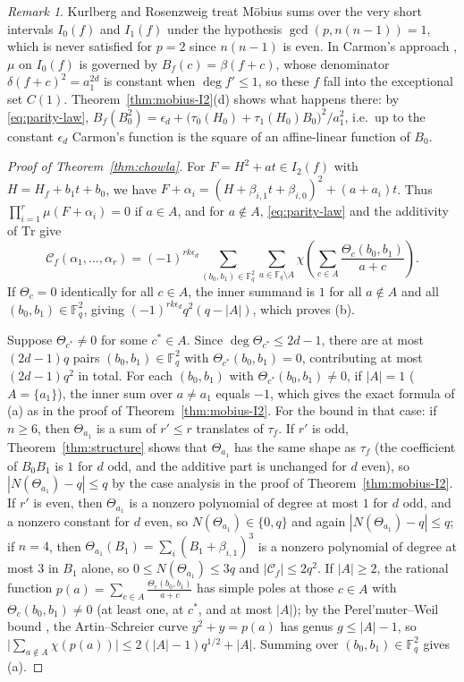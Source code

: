 \documentclass[11pt,a4paper]{amsart}
\theoremstyle{remark}
\newtheorem{remark}[theorem]{Remark}
\numberwithin{equation}{section}
\newcommand{\Fq}{\mathbb{F}_q}
\newcommand{\Tr}{\mathrm{Tr}}
\begin{document}
\begin{remark}\label{rem:KR}
Kurlberg and Rosenzweig \cite[Theorem~13]{KR} treat M\"obius sums over the very short intervals $I_0(f)$ and $I_1(f)$
under the hypothesis $\gcd(p,n(n-1))=1$, which is never satisfied for $p=2$ since $n(n-1)$ is even. In Carmon's
approach \cite{Carmon}, $\mu$ on $I_0(f)$ is governed by $B_f(c)=\beta(f+c)$, whose denominator $\delta(f+c)^2=a_1^{2d}$
is constant when $\deg f'\le 1$, so these $f$ fall into the exceptional set $C(1)$.
Theorem~\ref{thm:mobius-I2}(d) shows what happens there: by \eqref{eq:parity-law},
$B_f(B_0^2)=\epsilon_d+\bigl(\tau_0(H_0)+\tau_1(H_0)B_0\bigr)^2/a_1^2$, i.e.\ up to the constant $\epsilon_d$ Carmon's
function is the square of an affine-linear function of $B_0$.
\end{remark}

\begin{proof}[Proof of Theorem~\ref{thm:chowla}]
For $F=H^2+at\in I_2(f)$ with $H=H_f+b_1t+b_0$, we have $F+\alpha_i=(H+\beta_{i,1}t+\beta_{i,0})^2+(a+a_i)t$. Thus
$\prod_{i=1}^r\mu(F+\alpha_i)=0$ if $a\in A$, and for $a\notin A$, \eqref{eq:parity-law} and the additivity of $\Tr$
give
\[
\mathcal{C}_f(\alpha_1,\dots,\alpha_r)=(-1)^{rk\epsilon_d}\sum_{(b_0,b_1)\in\Fq^2}\sum_{a\in\Fq\setminus A}
\chi\!\left(\sum_{c\in A}\frac{\Theta_c(b_0,b_1)}{a+c}\right).
\]
If $\Theta_c=0$ identically for all $c\in A$, the inner summand is $1$ for all $a\notin A$ and all $(b_0,b_1)\in\Fq^2$,
giving $(-1)^{rk\epsilon_d}q^2(q-|A|)$, which proves (b).

Suppose $\Theta_{c^*}\ne 0$ for some $c^*\in A$. Since $\deg\Theta_{c^*}\le 2d-1$, there are at most $(2d-1)q$ pairs
$(b_0,b_1)\in\Fq^2$ with $\Theta_{c^*}(b_0,b_1)=0$, contributing at most $(2d-1)q^2$ in total. For each $(b_0,b_1)$
with $\Theta_{c^*}(b_0,b_1)\ne 0$, if $|A|=1$ ($A=\{a_1\}$), the inner sum over $a\ne a_1$ equals $-1$, which gives the
exact formula of (a) as in the proof of Theorem~\ref{thm:mobius-I2}. For the bound in that case: if $n\ge 6$, then
$\Theta_{a_1}$ is a sum of $r'\le r$ translates of $\tau_f$. If $r'$ is odd, Theorem~\ref{thm:structure} shows that
$\Theta_{a_1}$ has the same shape as $\tau_f$ (the coefficient of $B_0B_1$ is $1$ for $d$ odd, and the additive part
is unchanged for $d$ even), so $|N(\Theta_{a_1})-q|\le q$ by the case analysis in the proof of
Theorem~\ref{thm:mobius-I2}. If $r'$ is even, then $\Theta_{a_1}$ is a nonzero polynomial of degree at most $1$ for
$d$ odd, and a nonzero constant for $d$ even, so $N(\Theta_{a_1})\in\{0,q\}$ and again $|N(\Theta_{a_1})-q|\le q$; if $n=4$, then $\Theta_{a_1}(B_1)=\sum_i(B_1+\beta_{i,1})^3$ is a nonzero polynomial of
degree at most $3$ in $B_1$ alone, so $0\le N(\Theta_{a_1})\le 3q$ and $|\mathcal{C}_f|\le 2q^2$. If $|A|\ge 2$, the rational function
$p(a)=\sum_{c\in A}\frac{\Theta_c(b_0,b_1)}{a+c}$ has simple poles at those $c\in A$ with $\Theta_c(b_0,b_1)\ne 0$ (at
least one, at $c^*$, and at most $|A|$); by the Perel'muter--Weil bound \cite[Theorem~3.1]{Carmon}, the Artin--Schreier
curve $y^2+y=p(a)$ has genus $g\le |A|-1$, so $\bigl|\sum_{a\notin A}\chi(p(a))\bigr|\le 2(|A|-1)q^{1/2}+|A|$. Summing
over $(b_0,b_1)\in\Fq^2$ gives (a).


\end{proof}
\end{document}
